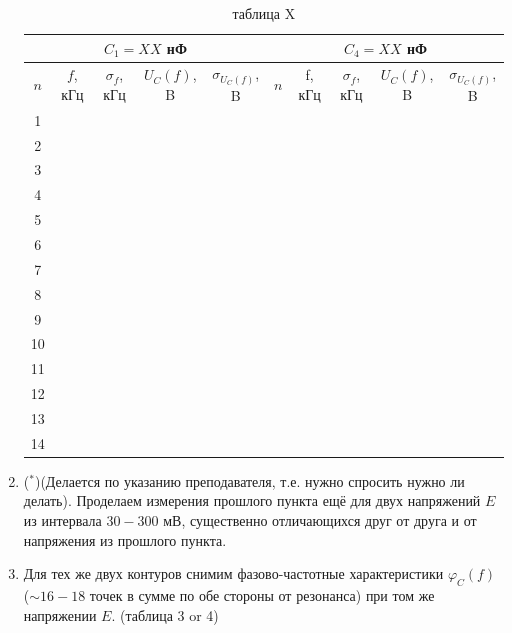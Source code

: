 \documentclass[a4paper, 12pt]{article}%
\begin{document}
\begin{enumerate}
\begin{table}[h]
\begin{center}
\begin{tabular}{|c|c|c|c|c||c|c|c|c|c|}
\hline \multicolumn{5}{|c||}{$C_{1}=XX$ нФ} & \multicolumn{5}{c|}{$C_{4}=XX$ нФ } \\
\hline$n$ & $f$, кГц & $\sigma_{f}$, кГц & $U_C(f)$, B & $\sigma_{U_C(f)}$, B & $n$ & f, кГц & $\sigma_{f}$, кГц & $U_C(f)$, B & $\sigma_{U_C(f)}$, B \\
\hline 1   &  &  &  &  &  &  &  &  &  \\
\hline 2   &  &  &  &  &  &  &  &  &  \\
\hline 3   &  &  &  &  &  &  &  &  &  \\
\hline 4   &  &  &  &  &  &  &  &  &  \\
\hline 5   &  &  &  &  &  &  &  &  &  \\
\hline 6   &  &  &  &  &  &  &  &  &  \\
\hline 7   &  &  &  &  &  &  &  &  &  \\
\hline 8   &  &  &  &  &  &  &  &  &  \\
\hline 9   &  &  &  &  &  &  &  &  &  \\
\hline 10  &  &  &  &  &  &  &  &  &  \\
\hline 11  &  &  &  &  &  &  &  &  &  \\
\hline 12  &  &  &  &  &  &  &  &  &  \\
\hline 13  &  &  &  &  &  &  &  &  &  \\
\hline 14  &  &  &  &  &  &  &  &  &  \\

\hline
\end{tabular}
\caption{таблица X}
\end{center}
\end{table}


\item ($^{*}$)(Делается по указанию преподавателя, т.е. нужно спросить нужно ли делать). Проделаем измерения прошлого пункта ещё для двух напряжений $E$ из интервала
$30-300$ мВ, существенно отличающихся друг от друга и от напряжения из прошлого пункта.



\newpage


\item Для тех же двух контуров снимим фазово-частотные характеристики $\varphi_C(f)$ ($\sim 16-18$ точек в сумме по обе стороны от резонанса) при том же
напряжении $E$. (таблица 3 or 4)


\end{enumerate}
\end{document}
